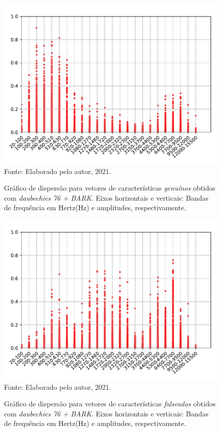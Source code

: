 \begin{figure}[H]
	\centering
	\caption{Gráfico de dispersão para vetores de características \textit{genuínos} obtidos com \textit{daubechies 76 + BARK}.  Eixos horizontais e verticais: Bandas de frequência em Hertz(Hz) e amplitudes, respectivamente.}
	\includegraphics[scale=.75]{./images/results/barkVersusMel/Genuine_daub76_Bark.pdf}
	\label{fig:livedaub76bark}
	\\Fonte: Elaborado pelo autor, 2021.
\end{figure}
\begin{figure}[H]
	\centering
	\caption{Gráfico de dispersão para vetores de características \textit{falseados} obtidos com \textit{daubechies 76 + BARK}.  Eixos horizontais e verticais: Bandas de frequência em Hertz(Hz) e amplitudes, respectivamente.}
	\includegraphics[scale=.75]{./images/results/barkVersusMel/Spoofing_daub76_Bark.pdf}
	\label{fig:spoofingdaub76bark}
	\\Fonte: Elaborado pelo autor, 2021.
\end{figure}
